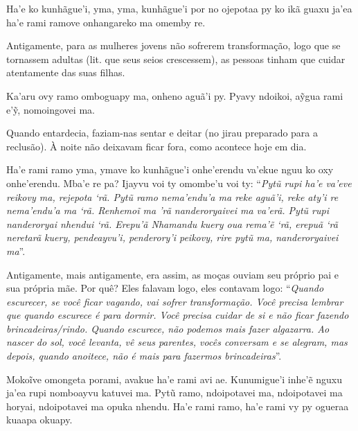 \begin{paracol}{2}
\footnotesize
\bigskip

\noindent
Ha’e ko kunhãgue’i, yma, yma, kunhãgue’i por no ojepotaa py ko ikã guaxu
ja’ea ha’e rami ramove onhangareko ma omemby re. 

\bigskip

\switchcolumn
\noindent
Antigamente, para as mulheres jovens não sofrerem transformação, logo
que se tornassem adultas (lit. que seus seios crescessem), as pessoas
tinham que cuidar atentamente das suas filhas. 

\smallskip

\switchcolumn
\noindent
Ka'aru ovy ramo omboguapy ma, onheno aguã'i py. Pyavy ndoikoi, aỹgua
rami e'ỹ, nomoingovei ma. 

\bigskip

\switchcolumn
\noindent
Quando entardecia, faziam-nas sentar e deitar (no jirau preparado para a
reclusão). À noite não deixavam ficar fora, como acontece hoje em dia. 

\smallskip

\switchcolumn
\noindent
Ha'e rami ramo yma, ymave ko kunhãgue'i onhe'erendu va'ekue nguu ko oxy
onhe'erendu. Mba'e re pa? Ijayvu voi ty omombe'u voi ty: ``\emph{Pytũ
rupi ha'e va'eve reikovy ma, rejepota `rã. Pytũ ramo nema'endu'a ma reke
aguã'i, reke aty'i re nema'endu'a ma `rã. Renhemoĩ ma 'rã nanderoryaivei
ma va'erã. Pytũ rupi nanderoryai nhendui `rã. Erepu'ã Nhamandu kuery oua
rema'ẽ `rã, erepuã `rã neretarã kuery, pendeayvu'i, penderory'i peikovy,
rire pytũ ma, nanderoryaivei ma}''. 

\bigskip

\switchcolumn
\noindent
Antigamente, mais antigamente, era assim, as moças ouviam seu próprio
pai e sua própria mãe. Por quê? Eles falavam logo, eles contavam logo:
``\emph{Quando escurecer, se você ficar vagando, vai sofrer
transformação. Você precisa lembrar que quando escurece é para dormir.
Você precisa cuidar de si e não ficar fazendo brincadeiras/rindo. Quando
escurece, não podemos mais fazer algazarra. Ao nascer do sol, você
levanta, vê seus parentes, vocês conversam e se alegram, mas depois,
quando anoitece, não é mais para fazermos brincadeiras}''.

\smallskip

\switchcolumn
\noindent
Mokoĩve omongeta porami, avakue ha'e rami avi ae. Kunumigue'i inhe'ẽ
nguxu ja'ea rupi nomboayvu katuvei ma. Pytũ ramo, ndoipotavei ma,
ndoipotavei ma horyai, ndoipotavei ma opuka nhendu. Ha'e rami ramo, ha'e
rami vy py ogueraa kuaapa okuapy.


\end{paracol}
